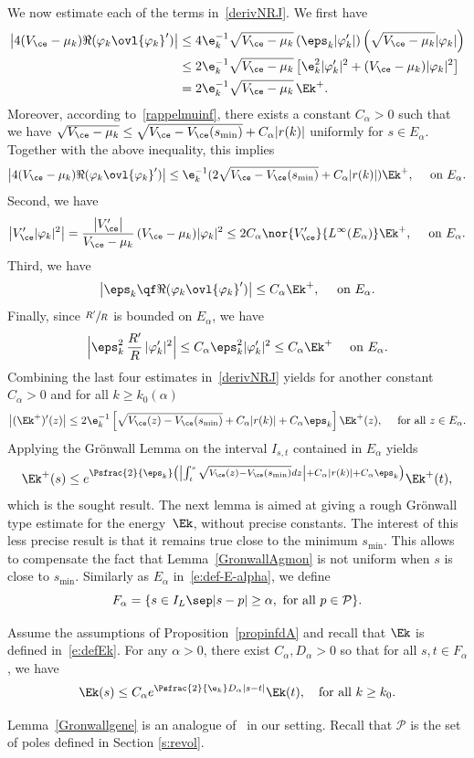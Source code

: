 We now estimate each of the terms in~\eqref{derivNRJ}. We first have
\begin{align*}
\left| 4(V_{\ce}-\mu_k)\Re(\varphi_k \ovl{\varphi_k}' )\right|
& \leq 4 \e_k^{-1} \sqrt{V_{\ce}-\mu_k} \left( \eps_k |\varphi_k'| \right) \left(\sqrt{V_{\ce}-\mu_k} |\varphi_k| \right) \\
& \leq 2 \e_k^{-1} \sqrt{V_{\ce}-\mu_k} \left[\e_k^2 |\varphi_k'|^2 + (V_{\ce}-\mu_k) |\varphi_k|^2 \right] \\
& =2\e_k^{-1} \sqrt{V_{\ce}-\mu_k}\, \Ek^+.
\end{align*}
Moreover, according to~\eqref{rappelmuinf}, there exists a constant $C_\alpha>0$ such that we have $\sqrt{V_{\ce}-\mu_k} \leq \sqrt{V_{\ce}-V_{\ce}(s_{\min})} + C_\alpha |r(k)|$ uniformly for $s\in E_\alpha$.
Together with the above inequality, this implies
\[
\left| 4(V_{\ce}-\mu_k)\Re(\varphi_k \ovl{\varphi_k}' ) \right|
\leq \e_k^{-1}(2\sqrt{V_{\ce}-V_{\ce}(s_{\min})} + C_\alpha |r(k)|)\Ek^+, \quad \text{ on } E_\alpha.
\]
Second, we have
\[
\left|V_{\ce}'|\varphi_k|^2\right|
= \frac{\left|V_{\ce}'\right|}{V_{\ce}-\mu_k}\, (V_{\ce}-\mu_k) |\varphi_k|^2
\leq 2C_\alpha\nor{V'_{\ce}}{L^\infty(E_\alpha)} \Ek^+, \quad \text{ on } E_\alpha.
\]
Third, we have
\[
\left|\eps_k\qf \Re(\varphi_k \ovl{\varphi_k}' ) \right|\leq C_\alpha \Ek^+, \quad \text{ on } E_\alpha.
\]
Finally, since $\sfrac{R'}{R}$ is bounded on $E_{\alpha}$, we have
\[
\Bigl|\eps_k^2\, \frac{R'}{R}\,|\varphi_k'|^2\Bigr|\leq C_\alpha \eps_k^2 |\varphi_k'|^2
\leq C_\alpha \Ek^+ \quad \text{ on } E_\alpha.
\]
Combining the last four estimates in~\eqref{derivNRJ} yields for another constant $C_\alpha>0$ and for all $k\geq k_0(\alpha)$
\[
\left| (\Ek^+)'(z) \right|\leq 2\e_k^{-1}\left[\sqrt{V_{\ce}(z)-V_{\ce}(s_{\min})} + C_\alpha|r(k)|+ C_\alpha \eps_k\right]\Ek^+(z),\quad \text{ for all }z \in E_\alpha.
\]
Applying the Grönwall Lemma on the interval $I_{s,t}$ contained in $E_{\alpha}$ yields
\[
\Ek^+(s) \leq e^{\Psfrac{2}{\eps_k}\left(\left|\int_t^s \sqrt{V_{\ce}(z)-V_{\ce}(s_{\min})}dz \right| + C_\alpha|r(k)|+ C_\alpha \eps_k\right)}\Ek^+(t),
\]
which is the sought result.
\enp
The next lemma is aimed at giving a rough Grönwall type estimate for the energy~$\Ek$, without precise constants. The interest of this less precise result is that it remains true close to the minimum $s_{\min}$. This allows to compensate the fact that Lemma~\ref{GronwallAgmon} is not uniform when $s$ is close to $s_{\min}$.
Similarly as $E_\alpha$ in~\eqref{e:def-E-alpha}, we define
\[
F_\alpha = \{ s \in I_L \sep |s-p| \geq \alpha, \text{ for all } p\in\mathcal{P} \}.
\]
\begin{lemma}
\label{Gronwallgene}
Assume the assumptions of Proposition~\ref{propinfdA} and recall that $\Ek$ is defined in~\eqref{e:defEk}.
For any $\alpha>0$, there exist $C_{\alpha},D_{\alpha}>0$ so that for all $s,t \in F_\alpha$, we have
\[
\Ek(s)\leq C_{\alpha}e^{\Psfrac{2}{\e_k}D_{\alpha}|s-t|}\Ek(t), \quad \text{for all }k\geq k_0.
\]
\end{lemma}
Lemma~\ref{Gronwallgene} is an analogue of~\cite[Lem.\,11]{Allibert:98} in our setting.
Recall that $\mathcal{P}$ is the set of poles defined in Section \ref{s:revol}.

